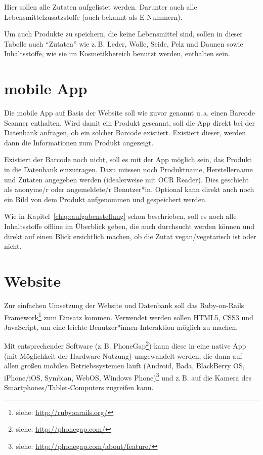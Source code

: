 \documentclass[a4paper]{report}
\begin{document}
Hier sollen alle Zutaten aufgelistet werden. Darunter auch alle
Lebensmittelzusatzstoffe (auch bekannt als E-Nummern).

Um auch Produkte zu speichern, die keine Lebensmittel sind, sollen in
dieser Tabelle auch ``Zutaten'' wie z.\,B. Leder, Wolle, Seide, Pelz und
Daunen sowie Inhaltsstoffe,
wie sie im Kosmetikbereich benutzt werden, enthalten sein.

\section{mobile App}

Die mobile App auf Basis der Website soll wie zuvor genannt
u.\,a. einen Barcode Scanner enthalten. Wird damit ein Produkt gescannt, soll die
App direkt bei der Datenbank anfragen, ob ein solcher Barcode
existiert. Existiert dieser, werden dann die Informationen zum
Produkt angezeigt.

Existiert der Barcode noch nicht, soll es mit der App möglich sein,
das Produkt in die Datenbank einzutragen. Dazu müssen noch Produktname,
Herstellername und Zutaten angegeben werden (idealerweise mit
OCR Reader). Dies geschieht als anonyme/r oder angemeldete/r Benutzer*in.
Optional kann direkt auch noch ein Bild von dem Produkt aufgenommen und
gespeichert werden.

Wie in Kapitel~\ref{chap:aufgabenstellung} schon beschrieben, soll es
noch alle Inhaltsstoffe offline im Überblick geben, die auch durchsucht
werden können und direkt auf einen Blick ersichtlich machen, ob die
Zutat vegan/vegetarisch ist oder nicht.

\section{Website}
\label{website}

Zur einfachen Umsetzung der Website und Datenbank soll das Ruby-on-Rails
Framework\footnote{siehe: \url{http://rubyonrails.org/}} zum Einsatz
kommen. Verwendet werden sollen HTML5, CSS3 und
JavaScript, um eine leichte Benutzer*innen-Interaktion möglich zu machen.

Mit entsprechender Software (z.\,B. PhoneGap\footnote{siehe:
\url{http://phonegap.com/}}) kann diese in eine native App (mit Möglichkeit der
Hardware Nutzung) umgewandelt werden, die
dann auf allen großen mobilen Betriebssystemen läuft (Android, Bada,
BlackBerry OS, iPhone/iOS, Symbian, WebOS, Windows
Phone)\footnote{siehe: \url{http://phonegap.com/about/feature/}} und z.\,B.
auf die Kamera des Smartphones/Tablet-Computers zugreifen kann.
\end{document}
